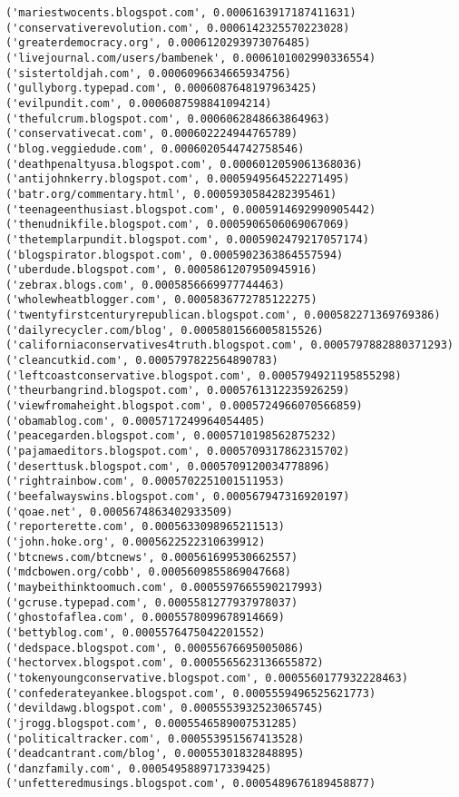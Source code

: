\documentclass[11pt]{article}
\begin{document}
\begin{Verbatim}[commandchars=\\\{\}]
('mariestwocents.blogspot.com', 0.0006163917187411631)
('conservativerevolution.com', 0.0006142325570223028)
('greaterdemocracy.org', 0.0006120293973076485)
('livejournal.com/users/bambenek', 0.0006101002990336554)
('sistertoldjah.com', 0.0006096634665934756)
('gullyborg.typepad.com', 0.0006087648197963425)
('evilpundit.com', 0.0006087598841094214)
('thefulcrum.blogspot.com', 0.0006062848663864963)
('conservativecat.com', 0.000602224944765789)
('blog.veggiedude.com', 0.0006020544742758546)
('deathpenaltyusa.blogspot.com', 0.0006012059061368036)
('antijohnkerry.blogspot.com', 0.0005949564522271495)
('batr.org/commentary.html', 0.0005930584282395461)
('teenageenthusiast.blogspot.com', 0.0005914692990905442)
('thenudnikfile.blogspot.com', 0.0005906506069067069)
('thetemplarpundit.blogspot.com', 0.0005902479217057174)
('blogspirator.blogspot.com', 0.0005902363864557594)
('uberdude.blogspot.com', 0.0005861207950945916)
('zebrax.blogs.com', 0.0005856669977744463)
('wholewheatblogger.com', 0.0005836772785122275)
('twentyfirstcenturyrepublican.blogspot.com', 0.000582271369769386)
('dailyrecycler.com/blog', 0.0005801566005815526)
('californiaconservatives4truth.blogspot.com', 0.0005797882880371293)
('cleancutkid.com', 0.0005797822564890783)
('leftcoastconservative.blogspot.com', 0.0005794921195855298)
('theurbangrind.blogspot.com', 0.0005761312235926259)
('viewfromaheight.blogspot.com', 0.0005724966070566859)
('obamablog.com', 0.0005717249964054405)
('peacegarden.blogspot.com', 0.0005710198562875232)
('pajamaeditors.blogspot.com', 0.0005709317862315702)
('deserttusk.blogspot.com', 0.0005709120034778896)
('rightrainbow.com', 0.0005702251001511953)
('beefalwayswins.blogspot.com', 0.000567947316920197)
('qoae.net', 0.0005674863402933509)
('reporterette.com', 0.0005633098965211513)
('john.hoke.org', 0.0005622522310639912)
('btcnews.com/btcnews', 0.000561699530662557)
('mdcbowen.org/cobb', 0.0005609855869047668)
('maybeithinktoomuch.com', 0.0005597665590217993)
('gcruse.typepad.com', 0.0005581277937978037)
('ghostofaflea.com', 0.0005578099678914669)
('bettyblog.com', 0.0005576475042201552)
('dedspace.blogspot.com', 0.00055676695005086)
('hectorvex.blogspot.com', 0.0005565623136655872)
('tokenyoungconservative.blogspot.com', 0.0005560177932228463)
('confederateyankee.blogspot.com', 0.0005559496525621773)
('devildawg.blogspot.com', 0.0005553932523065745)
('jrogg.blogspot.com', 0.0005546589007531285)
('politicaltracker.com', 0.000553951567413528)
('deadcantrant.com/blog', 0.00055301832848895)
('danzfamily.com', 0.0005495889717339425)
('unfetteredmusings.blogspot.com', 0.0005489676189458877)

\end{Verbatim}
\end{document}
